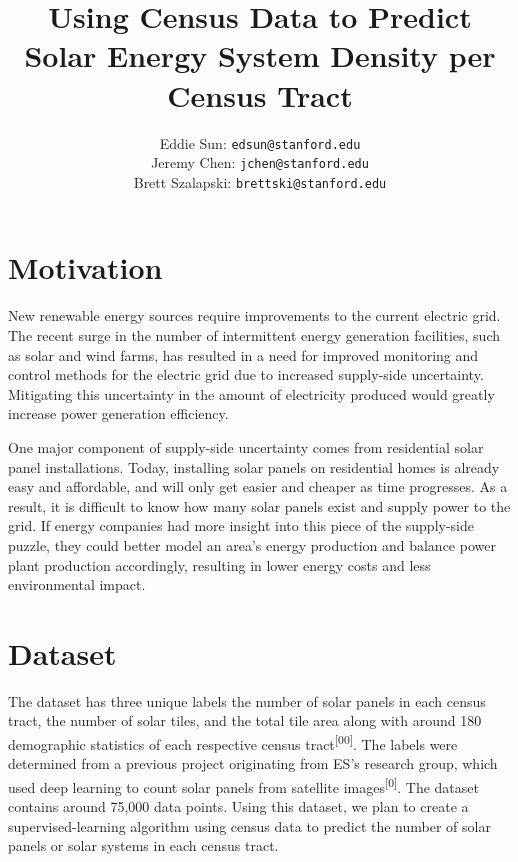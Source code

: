 \documentclass{article}
\title{Using Census Data to Predict Solar Energy System Density per Census Tract}
\author{ Eddie Sun: \texttt{edsun@stanford.edu}\\
  Jeremy Chen: \texttt{jchen@stanford.edu}\\
  Brett Szalapski: \texttt{brettski@stanford.edu}\\
}
\begin{document}
	
	\maketitle


	\section{Motivation}
	
	New renewable energy sources require improvements to the current electric grid. The recent surge in the number of intermittent energy generation facilities, such as solar and wind farms, has resulted in a need for improved monitoring and control methods for the electric grid due to increased supply-side uncertainty. Mitigating this uncertainty in the amount of electricity produced would greatly increase power generation efficiency.
	
	One major component of supply-side uncertainty comes from residential solar panel installations. Today, installing solar panels on residential homes is already easy and affordable, and will only get easier and cheaper as time progresses. As a result, it is difficult to know how many solar panels exist and supply power to the grid. If energy companies had more insight into this piece of the supply-side puzzle, they could better model an area’s energy production and balance power plant production accordingly, resulting in lower energy costs and less environmental impact.
	
	
	
	\section{Dataset}
	\label{dataset}
	
	The dataset has three unique labels \textemdash the number of solar panels in each census tract, the number of solar tiles, and the total tile area \textemdash along with around 180 demographic statistics of each respective census tract\textsuperscript{[00]}. The labels were determined from a previous project originating from ES’s research group, which used deep learning to count solar panels from satellite images\textsuperscript{[0]}. The dataset contains around 75,000 data points. Using this dataset, we plan to create a supervised-learning algorithm using census data to predict the number of solar panels or solar systems in each census tract.
	
\end{document}
